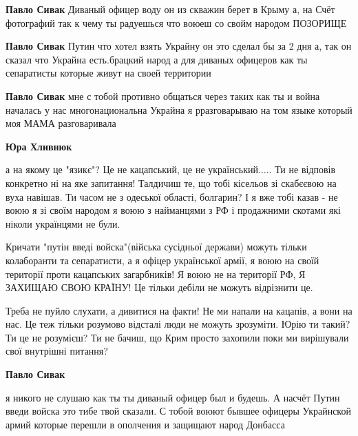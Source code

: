 \begin{itemize}
\begin{itemize}
\textbf{Павло Сивак} Диваный офицер воду он из скважин берет в Крыму а, на Счёт
фотографий так к чему ты радуешься что воюеш со свойм народом ПОЗОРИЩЕ

\textbf{Павло Сивак} Путин что хотел взять Украйну он это сделал бы за 2 дня а,
так он сказал что Украйна есть.брацкий народ а для диваных офицеров как ты
сепаратисты которые живут на своей территории

\textbf{Павло Сивак} мне с тобой противно общаться через таких как ты и война
началась у нас многонациональна Украйна я рразговарываю на том языке который
моя МАМА разговаривала

\textbf{Юра Хливнюк} 

а на якому це "язикє"? Це не кацапський, це не
український..... Ти не відповів конкретно ні на яке запитання! Талдичиш те, що
тобі кісельов зі скабєєвою на вуха навішав. Ти часом не з одеської області,
болгарин? І я вже тобі казав - не воюю я зі своїм народом я воюю з найманцями з
РФ і продажними скотами які ніколи українцями не були. 

Кричати "путін введі
войска"(війська сусідньої держави) можуть тільки колаборанти та сепаратисти, а
я офіцер української армії, я воюю на своїй території проти кацапських
загарбників! Я воюю не на території РФ, Я ЗАХИЩАЮ СВОЮ КРАЇНУ! Це тільки дебіли
не можуть відрізнити це. 

Треба не пуйло слухати, а дивитися на факти! Не ми
напали на кацапів, а вони на нас. Це теж тільки розумово відсталі люди не
можуть зрозуміти. Юрію ти такий? Ти це не розумієш? Ти не бачиш, що Крим просто
захопили поки ми вирішували свої внутрішні питання?

\textbf{Павло Сивак} 

я никого не слушаю как ты ты диваный офицер был и будешь.
А насчёт Путин введи войска это тибе твой сказали. С тобой воюют бывшее офицеры
Украйнской армий которые перешли в ополчения и защищают народ Донбасса
\end{itemize}



\end{itemize}

